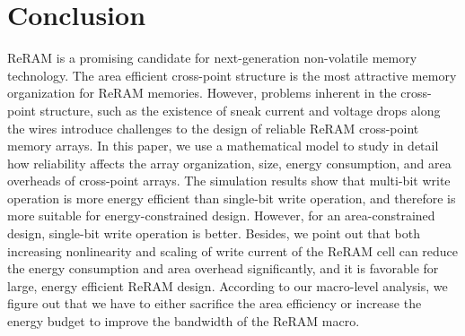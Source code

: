 \vspace{-5pt}
\section{Conclusion}\label{sec:conclusion}
ReRAM is a promising candidate for next-generation non-volatile memory
technology. The area efficient cross-point structure is the most
attractive memory organization for ReRAM memories. However, problems
inherent in the cross-point structure, such as the existence of sneak
current and voltage drops along the wires introduce challenges to the
design of reliable ReRAM cross-point memory arrays. In this paper, we use
a mathematical model to study in detail how reliability affects the array
organization, size, energy consumption, and area overheads of cross-point
arrays. The simulation results show that multi-bit write operation is more
energy efficient than single-bit write operation, and therefore is more
suitable for energy-constrained design. However, for an area-constrained
design, single-bit write operation is better. Besides, we point out that
both increasing nonlinearity and scaling of write current of the ReRAM
cell can reduce the energy consumption and area overhead significantly,
and it is favorable for large, energy efficient ReRAM design. According to
our macro-level analysis, we figure out that we have to either sacrifice
the area efficiency or increase the energy budget to improve the bandwidth
of the ReRAM macro.
